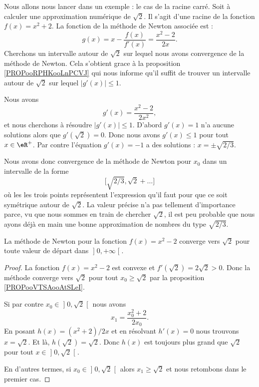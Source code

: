 Nous allons nous lancer dans un exemple : le cas de la racine carré. Soit à calculer une approximation numérique de \( \sqrt{ 2 }\). Il s'agit d'une racine de la fonction \( f(x)=x^2+2\). La fonction de la méthode de Newton associée est :
\begin{equation}
    g(x)=x-\frac{ f(x) }{ f'(x) }=\frac{ x^2-2 }{ 2x }.
\end{equation}
Cherchons un intervalle autour de \( \sqrt{ 2 }\) sur lequel nous avons convergence de la méthode de Newton. Cela s'obtient grace à la proposition \ref{PROPooRPHKooLnPCVJ} qui nous informe qu'il suffit de trouver un intervalle autour de \( \sqrt{ 2 }\) sur lequel \( | g'(x) |\leq 1\).

Nous avons 
\begin{equation}
    g'(x)=\frac{ x^2-2 }{ 2x^2 },
\end{equation}
et nous cherchons à résoudre \( | g'(x) |\leq 1\). D'abord \( g'(x)=1\) n'a aucune solutions alors que \( g'(\sqrt{ 2 })=0\). Donc nous avons \(  g'(x) \leq 1\) pour tout \( x\in \eR^+\). Par contre l'équation \( g'(x)=-1\) a des solutions : \( x=\pm\sqrt{ 2/3 }\).

Nous avons donc convergence de la méthode de Newton pour \( x_0\) dans un intervalle de la forme
\begin{equation}
    \mathopen[ \sqrt{ 2/3 } , \sqrt{ 2 }+\ldots \mathclose]
\end{equation}
où les les trois points représentent l'expression qu'il faut pour que ce soit symétrique autour de \( \sqrt{ 2 }\). La valeur précise n'a pas tellement d'importance parce, vu que nous sommes en train de chercher \( \sqrt{ 2 }\), il est peu probable que nous ayons déjà en main une bonne approximation de nombres du type \( \sqrt{ 2/3 }\).

\begin{proposition}
La méthode de Newton pour la fonction \( f(x)=x^2-2\) converge vers \( \sqrt{ 2 }\) pour toute valeur de départ dans \( \mathopen] 0 , +\infty \mathclose[\).
\end{proposition}

\begin{proof}
    La fonction \( f(x)=x^2-2\) est convexe et \( f'(\sqrt{ 2 })=2\sqrt{ 2 }>0\). Donc la méthode converge vers \( \sqrt{ 2 }\) pour tout \( x_0\geq \sqrt{ 2 }\) par la proposition \ref{PROPooVTSAooAtSLeI}.

    Si par contre \( x_0\in\mathopen] 0 , \sqrt{ 2 } \mathclose[\) nous avons
        \begin{equation}
            x_1=\frac{ x_0^2+2 }{ 2x_0 }.
        \end{equation}
    En posant \( h(x)=(x^2+2)/2x\) et en résolvant \( h'(x)=0\) nous trouvons \( x=\sqrt{ 2 }\). Et là, \( h(\sqrt{ 2 })=\sqrt{ 2 }\). Donc \( h(x)\) est toujours plus grand que \( \sqrt{ 2 }\) pour tout \( x\in\mathopen] 0 , \sqrt{ 2 } \mathclose[\).

    En d'autres termes, si \( x_0\in\mathopen] 0 , \sqrt{ 2 } \mathclose[\) alors \( x_1\geq \sqrt{ 2 }\) et nous retombons dans le premier cas.
\end{proof}

